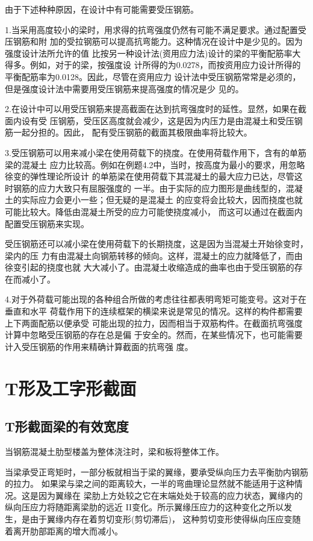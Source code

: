 \documentclass[12pt,a4paper]{book}
\begin{document}
由于下述种种原因，在设计中有可能需要受压钢筋。

1.当采用高度较小的梁时，用求得的抗弯强度仍然有可能不满足要求。通过配置受压钢筋和附
加的受拉钢筋可以提高抗弯能力。这种情况在设计中是少见的。因为强度设计法所允许的值
比按另一种设计法(资用应力法)设计的梁的平衡配筋率大得多。例如，对于的梁，按强度设
计所得的为0.0278，而按资用应力设计所得的平衡配筋率为0.0128。因此，尽管在资用应力
设计法中受压钢筋常常是必须的，但是强度设计法中需要用受压钢筋来提高强度的情况是少
见的。

2.在设计中可以用受压钢筋来提高截面在达到抗弯强度时的延性。显然，如果在截面内设有受
压钢筋，受压区高度就会减少，这是因为内压力是由混凝土和受压钢筋一起分担的。因此，
配有受压钢筋的截面其极限曲率将比较大。

3.受压钢筋可以用来减小梁在使用荷载下的挠度。在使用荷载作用下，含有的单筋梁的混凝土
应力比较高。例如在例题4.2中，当时，按高度为最小的要求，用忽略徐变的弹性理论所设计
的单筋梁在使用荷载下其混凝土的最大应力已达，尽管这时钢筋的应力大致只有屈服强度的
一半。由于实际的应力图形是曲线型的，混凝土的实际应力会更小一些；但无疑的是混凝土
的应变将会比较大，因而挠度也就可能比较大。降低由混凝土所受的应力可能使挠度减小，
而这可以通过在截面内配置受压钢筋来实现。

受压钢筋还可以减小梁在使用荷载下的长期挠度，这是因为当混凝土开始徐变时，梁内的压
力有由混凝土向钢筋转移的倾向。这样，混凝土的应力就降低了，而由徐变引起的挠度也就
大大减小了。由混凝土收缩造成的曲率也由于受压钢筋的存在而减小了。

4.对于外荷载可能出现的各种组合所做的考虑往往都表明弯矩可能变号。这对于在垂直和水平
荷载作用下的连续框架的横梁来说是常见的情况。这样的构件都需要上下两面配筋以便承受
可能出现的拉力，因而相当于双筋构件。在截面抗弯强度计算中忽略受压钢筋的存在总是偏
于安全的。然而，在某些情况下，也可能需要计入受压钢筋的作用来精确计算截面的抗弯强
度。

\section{T形及工字形截面}

\subsection{T形截面梁的有效宽度}

当钢筋混凝土肋型楼盖为整体浇注时，梁和板将整体工作。

当梁承受正弯矩时，一部分板就相当于梁的翼缘，要承受纵向压力去平衡肋内钢筋的拉力。
如果梁与梁之间的距离较大，一半的弯曲理论显然就不能适用于这种情况。这是因为翼缘在
梁肋上方处较之它在末端处处于较高的应力状态，翼缘内的纵向压应力将随距离梁肋的远近
II变化。所示翼缘压应力的这种变化之所以发生，是由于翼缘内存在着剪切变形(剪切滞后)，
这种剪切变形使得纵向压应变随着离开肋部距离的增大而减小。
\end{document}
